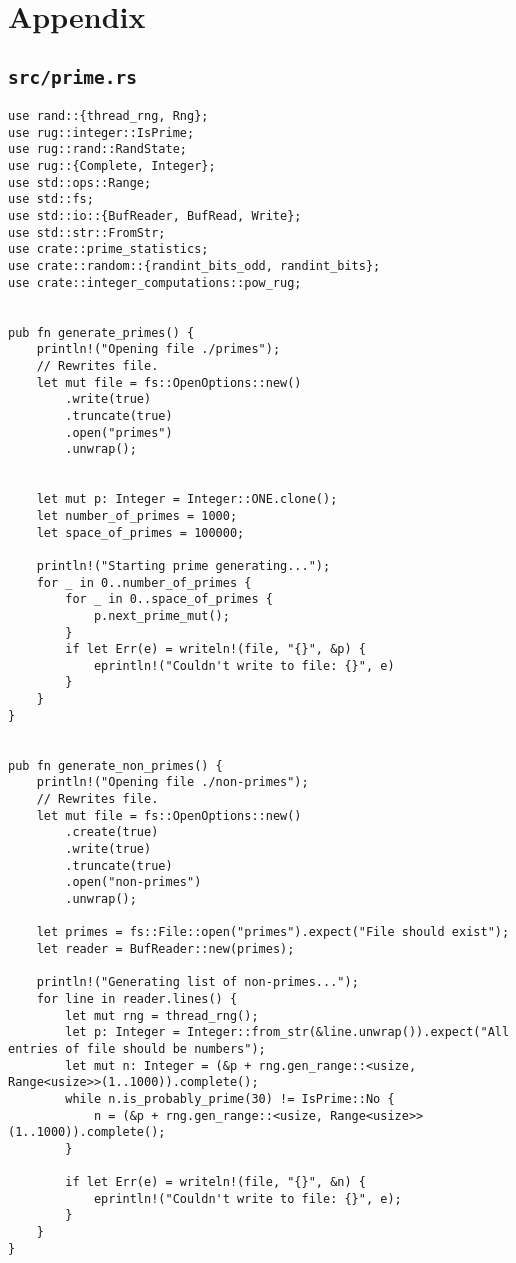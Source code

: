 \section{Appendix}\label{sec:appendix}

\subsection{\texttt{src/prime.rs}}
\begin{verbatim}
use rand::{thread_rng, Rng};
use rug::integer::IsPrime;
use rug::rand::RandState;
use rug::{Complete, Integer};
use std::ops::Range;
use std::fs;
use std::io::{BufReader, BufRead, Write};
use std::str::FromStr;
use crate::prime_statistics;
use crate::random::{randint_bits_odd, randint_bits};
use crate::integer_computations::pow_rug;


pub fn generate_primes() {
    println!("Opening file ./primes");
    // Rewrites file.
    let mut file = fs::OpenOptions::new()
        .write(true)
        .truncate(true)
        .open("primes")
        .unwrap();
    
    
    let mut p: Integer = Integer::ONE.clone();
    let number_of_primes = 1000;
    let space_of_primes = 100000;

    println!("Starting prime generating...");
    for _ in 0..number_of_primes {
        for _ in 0..space_of_primes {
            p.next_prime_mut();
        }
        if let Err(e) = writeln!(file, "{}", &p) {
            eprintln!("Couldn't write to file: {}", e)
        }
    }
}


pub fn generate_non_primes() {
    println!("Opening file ./non-primes");
    // Rewrites file.
    let mut file = fs::OpenOptions::new()
        .create(true)
        .write(true)
        .truncate(true)
        .open("non-primes")
        .unwrap();

    let primes = fs::File::open("primes").expect("File should exist");
    let reader = BufReader::new(primes);

    println!("Generating list of non-primes...");
    for line in reader.lines() {
        let mut rng = thread_rng();
        let p: Integer = Integer::from_str(&line.unwrap()).expect("All entries of file should be numbers"); 
        let mut n: Integer = (&p + rng.gen_range::<usize, Range<usize>>(1..1000)).complete();
        while n.is_probably_prime(30) != IsPrime::No {
            n = (&p + rng.gen_range::<usize, Range<usize>>(1..1000)).complete();
        }

        if let Err(e) = writeln!(file, "{}", &n) {
            eprintln!("Couldn't write to file: {}", e);
        }
    }
}



\end{verbatim}

